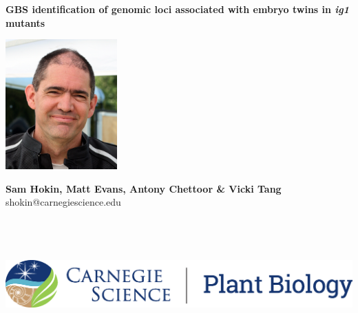 \documentclass[maize,portrait]{a0poster}
\begin{document}


\textbf{\color{CarnegiePriBlue} \VeryHuge GBS identification of genomic loci associated with embryo twins in \textit{ig1} mutants}    %

\begin{minipage}[m]{0.08\linewidth}
  \includegraphics[height=50mm]{sam-bfr-smiling-crop.jpg} %
\end{minipage}
\begin{minipage}[m]{0.50\linewidth}                      %
  \color{Black}
  \Huge \textbf{Sam Hokin, Matt Evans, Antony Chettoor \& Vicki Tang} \\
  \Large shokin@carnegiescience.edu
\end{minipage}
\hfill
\begin{minipage}[m]{0.40\linewidth}                      %
  \hfill
  \includegraphics[height=50mm]{CS_plantbio_logo_horz.eps} %
\end{minipage}
\end{document}
